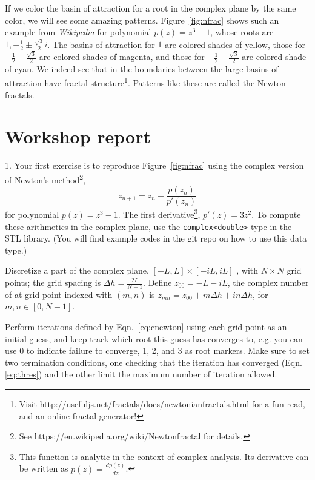 \documentclass{article}
\begin{document}
If we color the basin of attraction for a root in the complex plane by the same color, we will see some amazing patterns.
Figure~\ref{fig:nfrac} shows such an example from \textit{Wikipedia} for polynomial $p(z)=z^3-1$, whose roots are $1, -\frac12 \pm \frac{\sqrt{3}}{2} i$. 
The basins of attraction for $1$ are colored shades of yellow, those for $-\frac12 + \frac{\sqrt{3}}{2}$ are colored shades of magenta, and those for  $-\frac12 - \frac{\sqrt{3}}{2}$ are colored shade of cyan. 
We indeed see that in the boundaries between the large basins of attraction have fractal structure\footnote{Visit  \color{blue} {http://usefuljs.net/fractals/docs/newtonian\textunderscore fractals.html }\color{black} for a fun read, and an online fractal generator!}.
Patterns like these are called the Newton fractals.
 
 \section*{Workshop report}
 1. Your first exercise is to reproduce Figure~\ref{fig:nfrac} using the complex version of Newton's method\footnote{See   \color{blue} https://en.wikipedia.org/wiki/Newton\textunderscore fractal \color{black} for details.},
 \begin{equation}
 z_{n+1} = z_n - \frac{p(z_n)}{p'(z_n)}
 \label{eq:cnewton}
 \end{equation}
 for polynomial $p(z)=z^3-1$. The first derivative\footnote{This function is analytic in the context of complex analysis. Its derivative can be written as $p(z) = \frac{dp(z)}{dz}$.}, $p'(z) = 3z^2$.  To compute these arithmetics in the complex plane, use the \texttt{complex<double>} type in the STL library. (You will find example codes in the git repo on how to use this data type.)
 
Discretize a part of the complex plane, $[ -L, L]\times [-iL, iL ]$ , with $N\times N$ grid points; the grid spacing is $\Delta h = \frac{2L}{N-1}$.
Define $z_{00} = -L - iL$, the complex number of at grid point indexed with $(m,n)$ is $z_{mn} = z_{00} + m \Delta h + i n \Delta h$, for $m, n \in [0, N-1]$. 

Perform iterations defined by Eqn.~\ref{eq:cnewton} using each grid point as an initial guess, and keep track which root this guess has converges to, e.g. you can use 0 to indicate failure to converge, 1, 2, and 3 as root markers. 
Make sure to set two termination conditions, one checking that the iteration has converged (Eqn.\ref{eq:thres}) and the other limit the maximum number of iteration allowed. 
\end{document}
